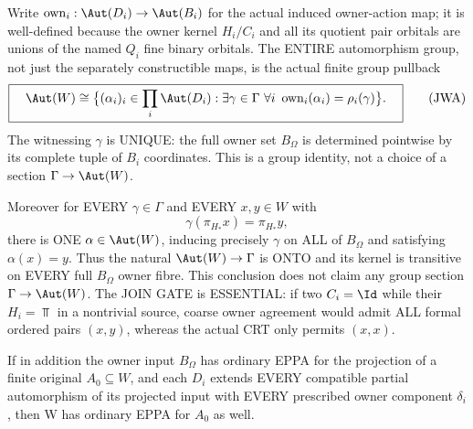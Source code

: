 \begin{lemma}
Write $\operatorname{own}_i:\Aut(D_i)\to\Aut(B_i)$
for the actual induced owner-action map;
it is well-defined because the owner
kernel $H_i/C_i$ and all its quotient
pair orbitals are unions of the named
$Q_i$ fine binary orbitals.
The ENTIRE automorphism group, not just
the separately constructible maps, is
the actual finite group pullback
\[
 \boxed{\quad
 \Aut(W)\cong
 \bigl\{(\alpha_i)_i\in\prod_i\Aut(D_i):
   \exists\gamma\in\Gamma\
   \forall i\
   \operatorname{own}_i(\alpha_i)
                    =\rho_i(\gamma)\bigr\}.
 \quad}
 \tag{JWA}\label{eq:acf-joint-owner-automorphisms}
\]
The witnessing $\gamma$ is UNIQUE:
the full owner set $B_\Omega$ is
determined pointwise by its complete
tuple of $B_i$ coordinates. This is
a group identity, not a choice of a
section $\Gamma\to\Aut(W)$.

Moreover for EVERY
$\gamma\in\Gamma$ and
EVERY $x,y\in W$ with
\[
            \gamma(\pi_{H_*}x)
                           =\pi_{H_*}y,
\]
there is ONE
$\alpha\in\Aut(W)$,
inducing precisely
$\gamma$ on ALL of
$B_\Omega$ and satisfying
$\alpha(x)=y$.
Thus the natural
$\Aut(W)\to\Gamma$
is ONTO and its kernel
is transitive on EVERY
full $B_\Omega$ owner
fibre. This conclusion
does not claim any
group section
$\Gamma\to\Aut(W)$.
The JOIN GATE is
ESSENTIAL: if two
$C_i=\Id$ while their
$H_i=\Top$ in a
nontrivial source,
coarse owner agreement
would admit ALL formal
ordered pairs $(x,y)$,
whereas the actual CRT
only permits $(x,x)$.

If in addition the
owner input
$B_\Omega$ has ordinary
EPPA for the projection
of a finite original
$A_0\subseteq W$, and
each $D_i$ extends
EVERY compatible partial
automorphism of its
projected input with
EVERY prescribed owner
component $\delta_i$,
then W has ordinary
EPPA for $A_0$ as well.
\end{lemma}
